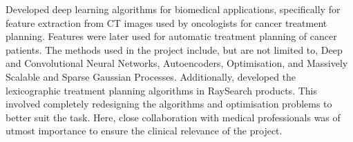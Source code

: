 Developed deep learning algorithms for biomedical applications, specifically for feature extraction from CT images used by oncologists for cancer treatment planning.
Features were later used for automatic treatment planning of cancer patients.
The methods used in the project include, but are not limited to, Deep and Convolutional Neural Networks, Autoencoders, Optimisation, and Massively Scalable and Sparse Gaussian Processes.
Additionally, developed the lexicographic treatment planning algorithms in RaySearch products.
This involved completely redesigning the algorithms and optimisation problems to better suit the task.
Here, close collaboration with medical professionals was of utmost importance to ensure the clinical relevance of the project.